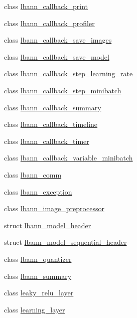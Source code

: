 \begin{DoxyCompactItemize}
class \hyperlink{classlbann_1_1lbann__callback__print}{lbann\+\_\+callback\+\_\+print}
\item 
class \hyperlink{classlbann_1_1lbann__callback__profiler}{lbann\+\_\+callback\+\_\+profiler}
\item 
class \hyperlink{classlbann_1_1lbann__callback__save__images}{lbann\+\_\+callback\+\_\+save\+\_\+images}
\item 
class \hyperlink{classlbann_1_1lbann__callback__save__model}{lbann\+\_\+callback\+\_\+save\+\_\+model}
\item 
class \hyperlink{classlbann_1_1lbann__callback__step__learning__rate}{lbann\+\_\+callback\+\_\+step\+\_\+learning\+\_\+rate}
\item 
class \hyperlink{classlbann_1_1lbann__callback__step__minibatch}{lbann\+\_\+callback\+\_\+step\+\_\+minibatch}
\item 
class \hyperlink{classlbann_1_1lbann__callback__summary}{lbann\+\_\+callback\+\_\+summary}
\item 
class \hyperlink{classlbann_1_1lbann__callback__timeline}{lbann\+\_\+callback\+\_\+timeline}
\item 
class \hyperlink{classlbann_1_1lbann__callback__timer}{lbann\+\_\+callback\+\_\+timer}
\item 
class \hyperlink{classlbann_1_1lbann__callback__variable__minibatch}{lbann\+\_\+callback\+\_\+variable\+\_\+minibatch}
\item 
class \hyperlink{classlbann_1_1lbann__comm}{lbann\+\_\+comm}
\item 
class \hyperlink{classlbann_1_1lbann__exception}{lbann\+\_\+exception}
\item 
class \hyperlink{classlbann_1_1lbann__image__preprocessor}{lbann\+\_\+image\+\_\+preprocessor}
\item 
struct \hyperlink{structlbann_1_1lbann__model__header}{lbann\+\_\+model\+\_\+header}
\item 
struct \hyperlink{structlbann_1_1lbann__model__sequential__header}{lbann\+\_\+model\+\_\+sequential\+\_\+header}
\item 
class \hyperlink{classlbann_1_1lbann__quantizer}{lbann\+\_\+quantizer}
\item 
class \hyperlink{classlbann_1_1lbann__summary}{lbann\+\_\+summary}
\item 
class \hyperlink{classlbann_1_1leaky__relu__layer}{leaky\+\_\+relu\+\_\+layer}
\item 
class \hyperlink{classlbann_1_1learning__layer}{learning\+\_\+layer}
\item 

\end{DoxyCompactItemize}
